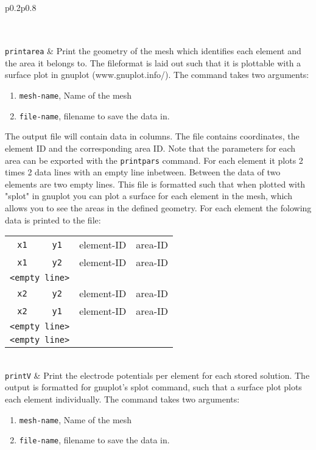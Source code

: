 \documentclass[noshowpacs,preprintnumbers,amsmath,amssymb, letter]{revtex4}
\begin{document}
\begin{longtable}{p{}p{}}
\begin{tabular}{cccc}
\end{tabular}\\
\texttt{printarea}	& Print the geometry of the mesh which identifies each element and the area it belongs to. The fileformat is laid out such that it is plottable with a surface plot in gnuplot (www.gnuplot.info/).  The command takes two arguments:
\begin{enumerate}
\item \texttt{mesh-name}, Name of the mesh
\item \texttt{file-name}, filename to save the data in.
\end{enumerate}
The output file will contain data in columns. The file contains coordinates, the element ID and the corresponding area ID. Note that the parameters for each area can be exported with  the \texttt{printpars} command. For each element it plots 2 times 2 data lines with an empty line inbetween. Between the data of two elements are two empty lines. This file is formatted such that when plotted with "splot" in gnuplot you can plot a surface for each element in the mesh, which allows you to see the areas in the defined geometry. For each element the folowing data is printed to the file:\newline 
\begin{tabular}{cccc}
	\texttt{x1} & \texttt{y1} & element-ID & area-ID\\
	\texttt{x1} & \texttt{y2} & element-ID & area-ID \\
	\multicolumn{2}{l}{\texttt{<empty line>}}\\
	\texttt{x2} & \texttt{y2} & element-ID & area-ID \\
	\texttt{x2} & \texttt{y1} & element-ID & area-ID \\
	\multicolumn{2}{l}{\texttt{<empty line>}}\\
	\multicolumn{2}{l}{\texttt{<empty line>}}\\
\end{tabular}\\
\texttt{printV}		& Print the electrode potentials per element for each stored solution. The output is formatted for gnuplot's splot command, such that a surface plot plots each element individually. The command takes two arguments:
\begin{enumerate}
\item \texttt{mesh-name}, Name of the mesh
\item \texttt{file-name}, filename to save the data in.

\end{enumerate}
\end{longtable}
\end{document}
